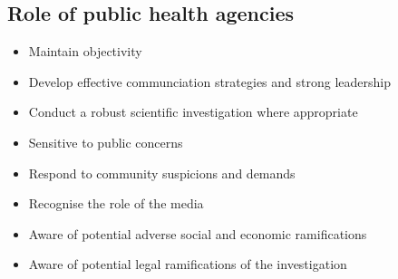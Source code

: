 \documentclass{article}
\begin{document}
\subsection{Role of public health agencies}
\begin{itemize}
    \item Maintain objectivity
    \item Develop effective communciation strategies and strong leadership
    \item Conduct a robust scientific investigation where appropriate
    \item Sensitive to public concerns
    \item Respond to community suspicions and demands
    \item Recognise the role of the media
    \item Aware of potential adverse social and economic ramifications
    \item Aware of potential legal ramifications of the investigation
\end{itemize}
\end{document}
